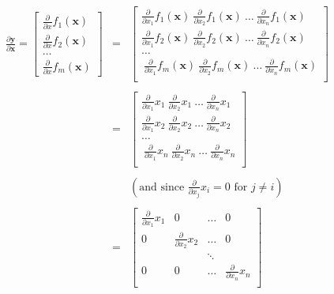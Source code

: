 \documentclass[11pt]{article}
\begin{document}
\begin{eqnarray*}
\frac{\partial \mathbf{y}}{\partial \mathbf{x}} = \begin{bmatrix}
\frac{\partial}{\partial {x}} f_1(\mathbf{x}) \\
\frac{\partial}{\partial {x}} f_2(\mathbf{x})\\
\ldots\\
\frac{\partial}{\partial {x}} f_m(\mathbf{x})
\end{bmatrix} &=& \begin{bmatrix}
\frac{\partial}{\partial {x_1}} f_1(\mathbf{x})~ \frac{\partial}{\partial {x_2}} f_1(\mathbf{x}) ~\ldots~ \frac{\partial}{\partial {x_n}} f_1(\mathbf{x}) \\
\frac{\partial}{\partial {x_1}} f_2(\mathbf{x})~ \frac{\partial}{\partial {x_2}} f_2(\mathbf{x}) ~\ldots~ \frac{\partial}{\partial {x_n}} f_2(\mathbf{x}) \\
\ldots\\
~\frac{\partial}{\partial {x_1}} f_m(\mathbf{x})~ \frac{\partial}{\partial {x_2}} f_m(\mathbf{x}) ~\ldots~ \frac{\partial}{\partial {x_n}} f_m(\mathbf{x}) \\
\end{bmatrix}\\\\
 & = & \begin{bmatrix}
\frac{\partial}{\partial {x_1}} x_1~ \frac{\partial}{\partial {x_2}} x_1 ~\ldots~ \frac{\partial}{\partial {x_n}} x_1 \\
\frac{\partial}{\partial {x_1}} x_2~ \frac{\partial}{\partial {x_2}} x_2 ~\ldots~ \frac{\partial}{\partial {x_n}} x_2 \\
\ldots\\
~\frac{\partial}{\partial {x_1}} x_n~ \frac{\partial}{\partial {x_2}} x_n ~\ldots~ \frac{\partial}{\partial {x_n}} x_n \\
\end{bmatrix}\\\\
& & (\text{and since } \frac{\partial}{\partial {x_j}} x_i = 0 \text{ for } j \neq i)\\\\
 & = & \begin{bmatrix}
\frac{\partial}{\partial {x_1}} x_1 & 0 & \ldots& 0 \\
0 & \frac{\partial}{\partial {x_2}} x_2 &\ldots & 0 \\
& & \ddots\\
0 & 0 &\ldots& \frac{\partial}{\partial {x_n}} x_n \\

\end{bmatrix}
\end{eqnarray*}
\end{document}
